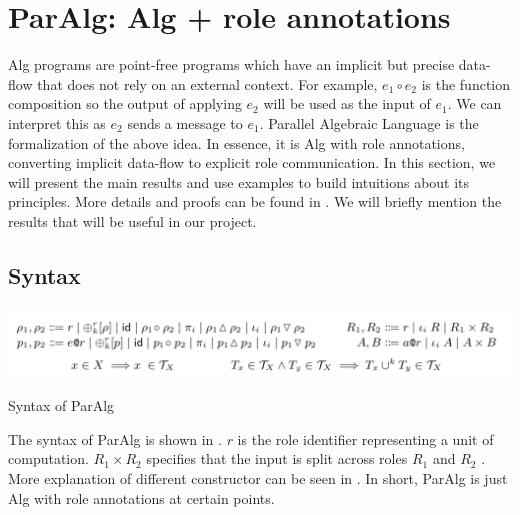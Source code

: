 \section{ParAlg: Alg + role annotations}
Alg programs are point-free programs which have an implicit but precise data-flow that does not rely on an external context. For example, $e_1 \circ e_2$ is the function composition so the output of applying $e_2$ will be used as the input of $e_1$. We can interpret this as $e_2$ sends a message to $e_1$. Parallel Algebraic Language is the formalization of the above idea. In essence, it is Alg with role annotations, converting implicit data-flow to explicit role communication. In this section, we will present the main results and use examples to build intuitions about its principles. More details and proofs can be found in \cite{AlgebraicMultipartyProtocol}. We will briefly mention the results that will be useful in our project.

\subsection{Syntax}
\begin{table}[ht]
    \centering
    \includegraphics[width=\textwidth]{project/paralg.png}
    \caption{Syntax of ParAlg}
    \label{project:tab:paralg}
\end{table}
The syntax of ParAlg is shown in . $r$ is the role identifier representing a unit of computation. $R_1 \times R_2$ specifies that the input is split across roles $R_1$ and $R_2$ \cite{AlgebraicMultipartyProtocol}. More explanation of different constructor can be seen in \cite{AlgebraicMultipartyProtocol}. In short, ParAlg is just Alg with role annotations at certain points. 

